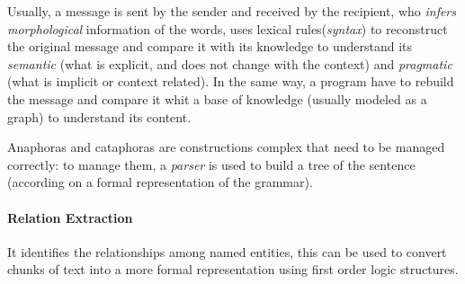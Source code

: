 \documentclass[11pt, a4page]{article}
\begin{document}
Usually, a message is sent by the sender and received by the recipient, who \textit{infers} \textit{morphological} information of the words, uses lexical rules(\textit{syntax}) to reconstruct the original message and compare it with its knowledge to understand its \textit{semantic} (what is explicit, and does not change with the context) and \textit{pragmatic} (what is implicit or context related).
In the same way, a program have to rebuild the message and compare it whit a base of knowledge (usually modeled as a graph) to understand its content.

Anaphoras and cataphoras are constructions complex that need to be managed correctly: to manage them, a \textit{parser} is used to build a tree of the sentence (according on a formal representation of the grammar).

\paragraph{Relation Extraction}
It identifies the relationships among named entities, this can be used to convert chunks of text into a more formal representation using first order logic structures.
\end{document}
